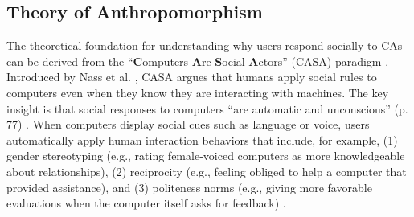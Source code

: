 \documentclass[sigconf,review,anonymous]{acmart}
\begin{document}
\subsection{Theory of Anthropomorphism}


The theoretical foundation for understanding why users respond socially to CAs can be derived from the ``\textbf{C}omputers \textbf{A}re \textbf{S}ocial \textbf{A}ctors'' (CASA) paradigm \cite{nass2000researching}. Introduced by Nass et al. \cite{nass1994computers}, CASA argues that humans apply social rules to computers even when they know they are interacting with machines. The key insight is that social responses to computers ``are automatic and
unconscious'' (p. 77) \citep{nass1994computers}. When computers display social cues such as language or voice, users automatically apply human interaction behaviors that include, for example, (1) gender stereotyping (e.g., rating female-voiced computers as more knowledgeable about relationships), (2) reciprocity (e.g., feeling obliged to help a computer that provided assistance), and (3) politeness norms (e.g., giving more favorable evaluations when the computer itself asks for feedback) \citep{nass1997machines}. 
\end{document}
